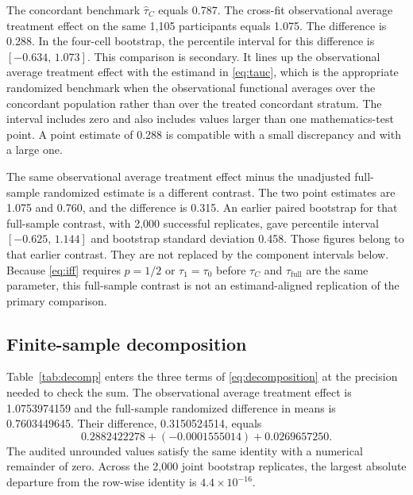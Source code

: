 \documentclass[11pt]{article}
\theoremstyle{remark}
\begin{document}
The concordant benchmark $\widehat\tau_C$ equals 0.787. The cross-fit observational average treatment effect on the same 1{,}105 participants equals 1.075. The difference is 0.288. In the four-cell bootstrap, the percentile interval for this difference is $[-0.634,\,1.073]$. This comparison is secondary. It lines up the observational average treatment effect with the estimand in \eqref{eq:tauc}, which is the appropriate randomized benchmark when the observational functional averages over the concordant population rather than over the treated concordant stratum. The interval includes zero and also includes values larger than one mathematics-test point. A point estimate of 0.288 is compatible with a small discrepancy and with a large one.

The same observational average treatment effect minus the unadjusted full-sample randomized estimate is a different contrast. The two point estimates are 1.075 and 0.760, and the difference is 0.315. An earlier paired bootstrap for that full-sample contrast, with 2{,}000 successful replicates, gave percentile interval $[-0.625,\,1.144]$ and bootstrap standard deviation 0.458. Those figures belong to that earlier contrast. They are not replaced by the component intervals below. Because \eqref{eq:iff} requires $p=1/2$ or $\tau_1=\tau_0$ before $\tau_C$ and $\tau_{\mathrm{full}}$ are the same parameter, this full-sample contrast is not an estimand-aligned replication of the primary comparison.

\subsection{Finite-sample decomposition}

Table~\ref{tab:decomp} enters the three terms of \eqref{eq:decomposition} at the precision needed to check the sum. The observational average treatment effect is 1.0753974159 and the full-sample randomized difference in means is 0.7603449645. Their difference, 0.3150524514, equals
\[
0.2882422278 + (-0.0001555014) + 0.0269657250.
\]
The audited unrounded values satisfy the same identity with a numerical remainder of zero. Across the 2{,}000 joint bootstrap replicates, the largest absolute departure from the row-wise identity is $4.4\times 10^{-16}$.
\end{document}
